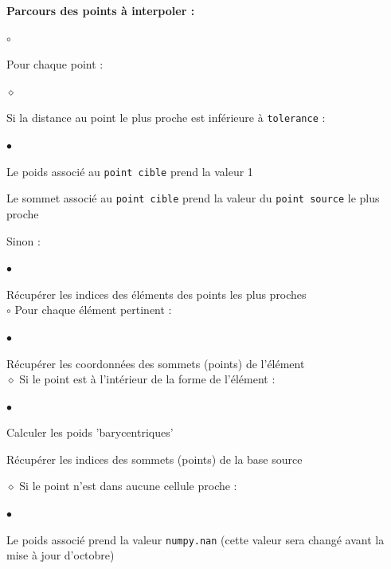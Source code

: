 \textbf{Parcours des points à interpoler :}
\begin{list}{$\circ$}{\leftmargin=0.5cm  \itemsep=0cm}
    \item Pour chaque point :
    \begin{list}{$\diamond$}{\leftmargin=0.5cm  \itemsep=0cm}
        \item Si la distance au point le plus proche est inférieure à \texttt{tolerance} :
        \begin{list}{$\bullet$}{\leftmargin=0.5cm \itemsep=0cm}
            \item Le poids associé au \texttt{point cible} prend la valeur 1
            \item Le sommet associé au \texttt{point cible} prend la valeur du \texttt{point source} le plus proche
        \end{list}
        \item Sinon :
        \begin{list}{$\bullet$}{\leftmargin=0.5cm  \itemsep=0cm}
            \item Récupérer les indices des éléments des points les plus proches\\
            $\circ$ Pour chaque élément pertinent :
            \begin{list}{$\bullet$}{\leftmargin=0.5cm \itemsep=0cm}
                \item Récupérer les coordonnées des sommets (points) de l'élément\\
                $\diamond$ Si le point est à l'intérieur de la forme de l'élément :
                \begin{list}{$\bullet$}{\leftmargin=0.5cm  \itemsep=0cm}
                    \item Calculer les poids 'barycentriques'
                    \item Récupérer les indices des sommets (points) de la base source
                \end{list}
            \end{list}
        \end{list}
    \end{list}
    $\diamond$ Si le point n'est dans aucune cellule proche :
    \begin{list}{$\bullet$}{\leftmargin=0.5cm  \itemsep=0cm}
        \item Le poids associé prend la valeur \texttt{numpy.nan} (cette valeur sera changé avant la mise à jour d'octobre)
    \end{list}
\end{list}

